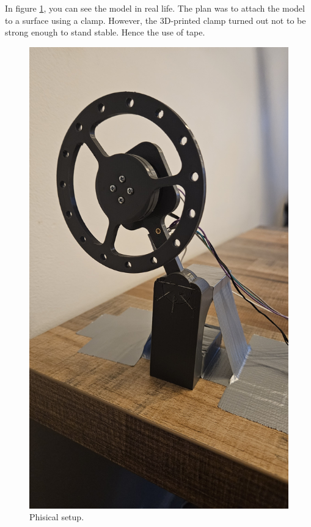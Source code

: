 \documentclass{article}
\begin{document}
\begin{multicols}{2}
In figure \ref{fig:Phisical setup}, you can see the model in real life. The plan was to attach the model to a surface using a clamp. However, the 3D-printed clamp turned out not to be strong enough to stand stable. Hence the use of tape.

\begin{figure}[H]
\centering
\includegraphics[scale=0.05, angle =-90 ]{20240114_155939}
\caption{Phisical setup.}
\label{fig:Phisical setup}
\end{figure}


\end{multicols}
\end{document}
